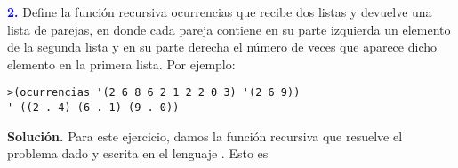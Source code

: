 \newpage\textbf{\textcolor{blue}{2.}} \Large
Define la función recursiva ocurrencias que recibe dos listas y devuelve una lista de parejas,
en donde cada pareja contiene en su parte izquierda un elemento de la segunda lista y en su
parte derecha el número de veces que aparece dicho elemento en la primera lista. Por ejemplo:

\begin{lstlisting}
>(ocurrencias '(2 6 8 6 2 1 2 2 0 3) '(2 6 9))
' ((2 . 4) (6 . 1) (9 . 0))
\end{lstlisting}

\textbf{Solución.} Para este ejercicio, damos la función recursiva que resuelve
el problema dado y escrita en el lenguaje . Esto es


